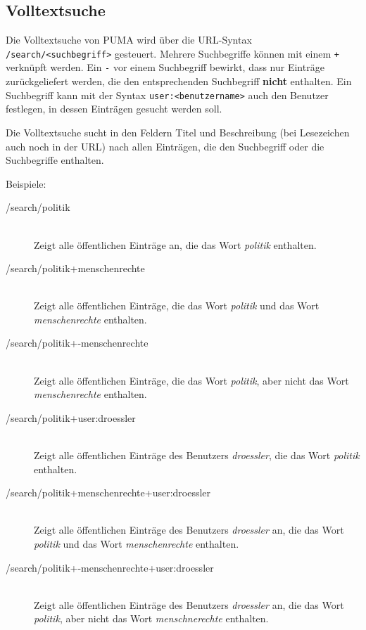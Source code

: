 \subsection{Volltextsuche}
\label{subsec:volltext}
Die Volltextsuche von PUMA wird über die URL-Syntax \texttt{/search/<suchbegriff>} gesteuert. Mehrere Suchbegriffe können mit einem \texttt{+} verknüpft werden. Ein \texttt{-} vor einem Suchbegriff bewirkt, dass nur Einträge zurückgeliefert werden, die den entsprechenden Suchbegriff \textbf{nicht} enthalten. Ein Suchbegriff kann mit der Syntax \texttt{user:<benutzername>} auch den Benutzer festlegen, in dessen Einträgen gesucht werden soll.

Die Volltextsuche sucht in den Feldern Titel und Beschreibung (bei Lesezeichen auch noch in der URL) nach allen Einträgen, die den Suchbegriff oder die Suchbegriffe enthalten.

Beispiele:
\label{subsec:volltextsuche}
\begin{description}
    \item [/search/politik] \hfill \\
    Zeigt alle öffentlichen Einträge an, die das Wort \textit{politik} enthalten. 
    \item [/search/politik+menschenrechte] \hfill \\
    Zeigt alle öffentlichen Einträge, die das Wort \textit{politik} und das Wort \textit{menschenrechte} enthalten. 
    \item [/search/politik+-menschenrechte] \hfill \\
    Zeigt alle öffentlichen Einträge, die das Wort \textit{politik}, aber nicht das Wort \textit{menschenrechte} enthalten. 
    \item [/search/politik+user:droessler] \hfill \\
    Zeigt alle öffentlichen Einträge des Benutzers \textit{droessler}, die das Wort \textit{politik} enthalten. 
    \item [/search/politik+menschenrechte+user:droessler] \hfill \\
    Zeigt alle öffentlichen Einträge des Benutzers \textit{droessler} an, die das Wort \textit{politik} und das Wort \textit{menschenrechte} enthalten. 
    \item [/search/politik+-menschenrechte+user:droessler] \hfill \\
    Zeigt alle öffentlichen Einträge des Benutzers \textit{droessler} an, die das Wort \textit{politik}, aber nicht das Wort \textit{menschnerechte} enthalten. 
\end{description}


